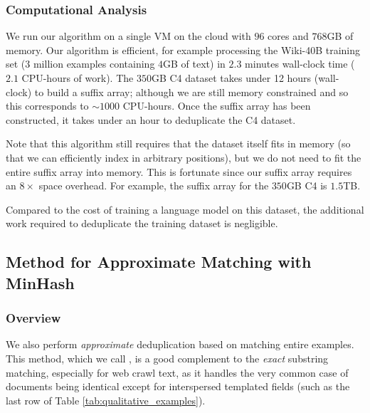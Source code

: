 \subsubsection{Computational Analysis}
We run our algorithm on a single VM on the cloud with $96$ cores and $768$GB of memory.
Our algorithm is efficient, for example processing the Wiki-40B training set ($3$ million
examples containing $4$GB of text) in $2.3$ minutes wall-clock time ($2.1$ CPU-hours of work).
%
The $350$GB C4 dataset takes under 12 hours (wall-clock) to build a suffix array; although we are still memory constrained and so this corresponds to $\sim 1000$ CPU-hours. 
% 
Once the suffix array has been constructed, it takes under an hour to deduplicate the C4 dataset.


Note that this algorithm still requires that the dataset itself fits in memory
(so that we can efficiently index in arbitrary positions), but we do not need to fit the entire suffix array into memory.
This is fortunate since our suffix array requires an $8\times$ space overhead.
For example, the suffix array for the
$350$GB C4 is $1.5$TB.

%

Compared to the cost of training a language model on this dataset, the additional
work required to deduplicate the training dataset is negligible.








\subsection{Method for Approximate Matching with MinHash} \label{sec:approx}

\subsubsection{Overview}

We also perform \emph{approximate} deduplication based on matching entire examples.
This method, which we call \Approx, is a good complement to the \emph{exact} substring matching, especially for web crawl text, as it handles the very common case of documents being identical except for interspersed templated fields (such as the last row of Table \ref{tab:qualitative_examples}).

